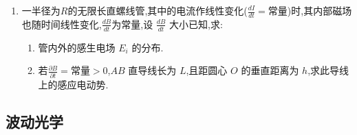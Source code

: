 \begin{enumerate}
	\vspace{5cm}

	\item[\textbf{L10-7}] 一半径为\(R\)的无限长直螺线管,其中的电流作线性变化(\(\frac{dI}{dt}=\text{常量}\))时,其内部磁场也随时间线性变化,\(\frac{dB}{dt}\)为常量,设 \(\frac{dB}{dt}\) 大小已知,求:
	
	\begin{enumerate}
		\item 管内外的感生电场 \(E_i\) 的分布.
		\item 若\(\frac{\partial B}{\partial t}=\text{常量}>0\),\(AB\) 直导线长为 \(L\),且距圆心 \(O\) 的垂直距离为 \(h\),求此导线上的感应电动势.
	\end{enumerate}
	
	
\end{enumerate}


\newpage
\subsection{波动光学}

